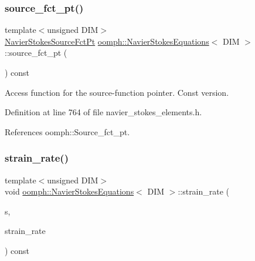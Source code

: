 \subsubsection{\texorpdfstring{source\+\_\+fct\+\_\+pt()}{source\_fct\_pt()}\hspace{0.1cm}{\footnotesize\ttfamily [2/2]}}
{\footnotesize\ttfamily template$<$unsigned D\+IM$>$ \\
\hyperlink{classoomph_1_1NavierStokesEquations_a1d69b671e6d4c0e75a02d6fa3dab478f}{Navier\+Stokes\+Source\+Fct\+Pt} \hyperlink{classoomph_1_1NavierStokesEquations}{oomph\+::\+Navier\+Stokes\+Equations}$<$ D\+IM $>$\+::source\+\_\+fct\+\_\+pt (\begin{DoxyParamCaption}{ }\end{DoxyParamCaption}) const\hspace{0.3cm}{\ttfamily [inline]}}



Access function for the source-\/function pointer. Const version. 



Definition at line 764 of file navier\+\_\+stokes\+\_\+elements.\+h.



References oomph\+::\+Source\+\_\+fct\+\_\+pt.

\mbox{\label{classoomph_1_1NavierStokesEquations_a76c94447cea90c07cd511efb5e9e263a}} 
\subsubsection{\texorpdfstring{strain\+\_\+rate()}{strain\_rate()}}
{\footnotesize\ttfamily template$<$unsigned D\+IM$>$ \\
void \hyperlink{classoomph_1_1NavierStokesEquations}{oomph\+::\+Navier\+Stokes\+Equations}$<$ D\+IM $>$\+::strain\+\_\+rate (\begin{DoxyParamCaption}\item[{const \hyperlink{classoomph_1_1Vector}{Vector}$<$ double $>$ \&}]{s,  }\item[{\hyperlink{classoomph_1_1DenseMatrix}{Dense\+Matrix}$<$ double $>$ \&}]{strain\+\_\+rate }\end{DoxyParamCaption}) const}



